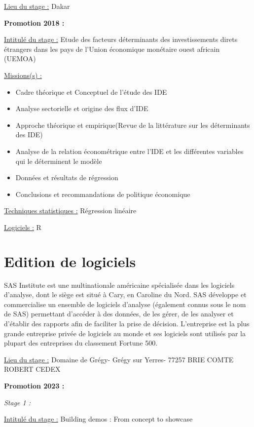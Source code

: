 \documentclass[
  letterpaper,
  DIV=11,
  numbers=noendperiod]{scrreprt}
\begin{document}
\uline{Lieu du stage :} Dakar

\textbf{Promotion 2018 :}

\uline{Intitulé du stage :} Etude des facteurs déterminants des
investissements direts étrangers dans les pays de l'Union économique
monétaire ouest africain (UEMOA)

\uline{Missions(s) :}

\begin{itemize}
\item
  Cadre théorique et Conceptuel de l'étude des IDE
\item
  Analyse sectorielle et origine des flux d'IDE
\item
  Approche théorique et empirique(Revue de la littérature sur les
  déterminants des IDE)
\item
  Analyse de la relation économétrique entre l'IDE et les différentes
  variables qui le déterminent le modèle
\item
  Données et résultats de régression
\item
  Conclusions et recommandations de politique économique
\end{itemize}

\uline{Techniques statistiques :} Régression linéaire

\uline{Logiciels :} R


\hypertarget{edition-de-logiciels}{%
\chapter{Edition de logiciels}\label{edition-de-logiciels}}

SAS Institute est une multinationale américaine spécialisée dans les
logiciels d'analyse, dont le siège est situé à Cary, en Caroline du
Nord. SAS développe et commercialise un ensemble de logiciels d'analyse
(également connus sous le nom de SAS) permettant d'accéder à des
données, de les gérer, de les analyser et d'établir des rapports afin de
faciliter la prise de décision. L'entreprise est la plus grande
entreprise privée de logiciels au monde et ses logiciels sont utilisés
par la plupart des entreprises du classement Fortune 500.

\uline{Lieu du stage :} Domaine de Grégy- Grégy sur Yerres- 77257 BRIE
COMTE ROBERT CEDEX

\textbf{Promotion 2023 :}

\emph{Stage 1 :}

\uline{Intitulé du stage :} Building demos : From concept to showcase
\end{document}
